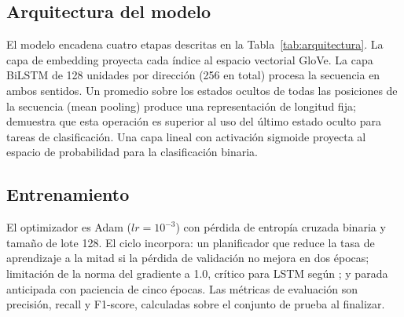 \documentclass[letterpaper, 10pt, conference]{ieeeconf}
\begin{document}
\subsection{Arquitectura del modelo}

El modelo encadena cuatro etapas descritas en la Tabla~\ref{tab:arquitectura}.
La capa de embedding proyecta cada \'indice al espacio vectorial GloVe. La
capa BiLSTM de 128 unidades por direcci\'on (256 en total) procesa la secuencia
en ambos sentidos. Un promedio sobre los estados ocultos de todas las posiciones
de la secuencia (mean pooling) produce una representaci\'on de longitud fija;
\cite{conneau2017} demuestra que esta operaci\'on es superior al uso del
\'ultimo estado oculto para tareas de clasificaci\'on. Una capa lineal con
activaci\'on sigmoide proyecta al espacio de probabilidad para la clasificaci\'on
binaria.

\begin{table}[h]
\centering
\caption{Capas del modelo \textit{SentimentBiLSTM}.}
\label{tab:arquitectura}
\end{table}

\subsection{Entrenamiento}

El optimizador es Adam ($lr = 10^{-3}$) con p\'erdida de entrop\'ia cruzada
binaria y tama\~no de lote 128. El ciclo incorpora: un planificador que reduce
la tasa de aprendizaje a la mitad si la p\'erdida de validaci\'on no mejora en
dos \'epocas; limitaci\'on de la norma del gradiente a 1.0, cr\'itico para
LSTM seg\'un \cite{greff2015}; y parada anticipada con paciencia de cinco
\'epocas. Las m\'etricas de evaluaci\'on son precisi\'on, recall y F1-score,
calculadas sobre el conjunto de prueba al finalizar.
\end{document}
